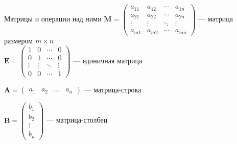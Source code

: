 \documentclass[10pt]{beamer}
\begin{document}
	\begin{frame}{Матрицы и операции над ними}
		$\mathbf M =
		\begin{pmatrix} a_{11} & a_{12} & \cdots & a_{1n}
			\\a_{21} & a_{22} & \cdots & a_{2n}
			\\ \vdots & \vdots & \ddots & \vdots
			\\ a_{m1} & a_{m2} & \cdots & a_{mn}
		\end{pmatrix} 
		$ --- матрица размером $m \times n$ \\
		$\mathbf E = \begin{pmatrix} 1 & 0 & \cdots & 0 \\ 0 & 1 & \cdots & 0 \\ \vdots & \vdots & \ddots & \vdots \\ 0 & 0 & \cdots & 1 \end{pmatrix}$ --- единичная матрица
		
		$\mathbf A = \begin{pmatrix}
			a_1 & a_2 & \ldots & a_n
		\end{pmatrix}$ --- матрица-строка
		
		$\mathbf B = \begin{pmatrix}
			b_1 \\ b_2 \\ \vdots \\ b_n
		\end{pmatrix}$ --- матрица-столбец	
		
	\end{frame}
	
\end{document}
